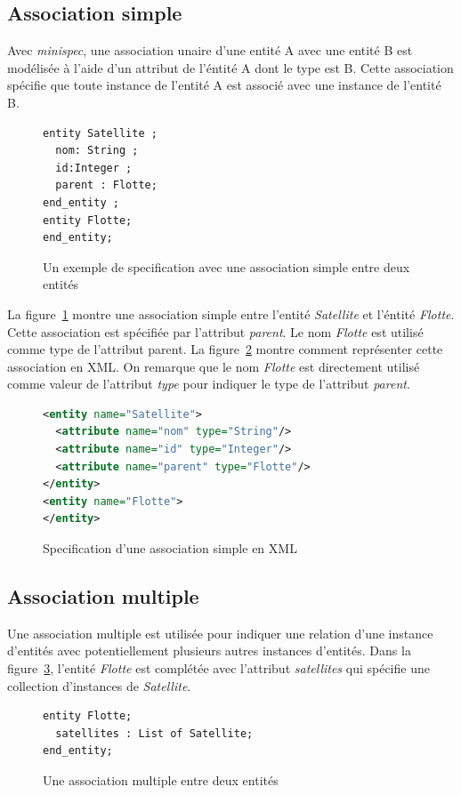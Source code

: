 \documentclass[12pt]{article}
\begin{document}
\subsection{Association simple}
Avec \textit{minispec}, une association unaire d'une entité A avec une entité B est modélisée à l'aide d'un attribut de l'éntité A dont le type est B. Cette association spécifie que toute instance de l'entité A est associé avec une instance de l'entité B.
\begin{figure}
\begin{lstlisting}[language=express]
entity Satellite ;
  nom: String ;
  id:Integer ;
  parent : Flotte;
end_entity ;
entity Flotte;
end_entity;
\end{lstlisting}
\caption{Un exemple de specification avec une association simple entre deux entités}
\label{fig:exemple-minispec2}
\end{figure} 
La figure~\ref{fig:exemple-minispec2} montre une association simple entre l'entité \textit{Satellite} et l'éntité \textit{Flotte}. Cette association est  spécifiée par l'attribut \textit{parent}. Le nom \textit{Flotte} est utilisé comme type de l'attribut parent. La figure~\ref{fig:exemple-minispec-XML2} montre comment représenter cette association en XML. On remarque que le nom \textit{Flotte} est directement utilisé comme valeur de l'attribut \textit{type} pour indiquer le type de l'attribut \textit{parent}.
\begin{figure}
\begin{lstlisting}[language=XML]
<entity name="Satellite">
  <attribute name="nom" type="String"/>
  <attribute name="id" type="Integer"/>
  <attribute name="parent" type="Flotte"/>
</entity>
<entity name="Flotte">
</entity>
\end{lstlisting}
\caption{Specification d'une association simple en XML}
\label{fig:exemple-minispec-XML2}
\end{figure} 




\subsection{Association multiple}
Une association multiple est utilisée pour indiquer une relation d'une instance d'entités avec potentiellement plusieurs autres instances d'entités. Dans la figure~\ref{fig:exemple-minispec3}, l'entité \textit{Flotte} est complétée avec l'attribut \textit{satellites} qui spécifie une collection d'instances de \textit{Satellite}. 
\begin{figure}
\begin{lstlisting}[language=express]
entity Flotte;
  satellites : List of Satellite;
end_entity;
\end{lstlisting}
\caption{Une association multiple entre deux entités}
\label{fig:exemple-minispec3}
\end{figure} 
\end{document}
